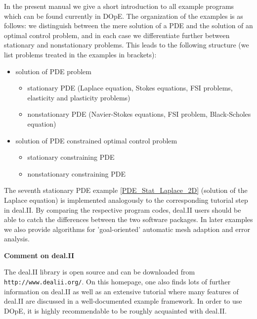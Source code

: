 In the present manual we give a short introduction to all example programs
which can be found currently in DOpE. The organization of the examples is
as follows: we distinguish between the mere solution of a PDE and the
solution of an optimal control problem, and in each case we differentiate
further between stationary and nonstationary problems. This leads to the
following structure (we list problems treated in the examples in
brackets):
\begin{itemize}
\item
solution of PDE problem
 \begin{itemize}
   \item
     stationary PDE (Laplace equation, Stokes equations, FSI problems,
elasticity and plasticity problems)
   \item
     nonstationary PDE (Navier-Stokes equations, FSI problem, Black-Scholes
equation)
 \end{itemize}
\item
solution of PDE constrained optimal control problem
 \begin{itemize}
   \item
     stationary constraining PDE
   \item
     nonstationary constraining PDE
 \end{itemize}
\end{itemize}
The seventh stationary PDE example \ref{PDE_Stat_Laplace_2D} 
(solution of the Laplace equation) is
implemented analogously to the corresponding tutorial step in deal.II. By
comparing the respective program codes, deal.II users should be able to
catch the differences between the two software packages.
In later examples we also provide algorithms for 'goal-oriented' automatic
mesh adaption and error analysis.

{\bf Comment on deal.II}

The deal.II library is open
source and can be downloaded from \texttt{http://www.dealii.org/}. On this
homepage, one also finds lots of further information on deal.II as well as
an extensive tutorial where many features of deal.II are discussed in a
well-documented example framework. In order to use DOpE, it is highly
recommendable to be roughly acquainted with deal.II.
